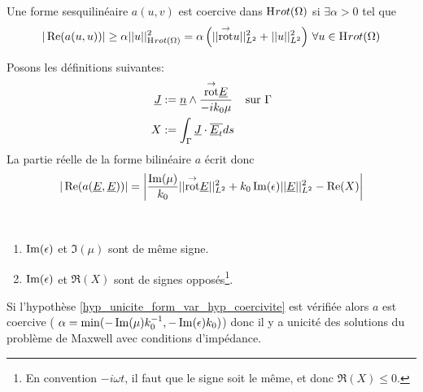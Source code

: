  \begin{defn}[Coercivité]
 Une forme sesquilinéaire $a(u,v)$ est coercive dans $\mathrm{H}_\mathrm{{}}{rot}(\Omega)$ si $\exists \alpha > 0$ tel que 
 \[
 |\operatorname{Re}(a(u,u))| \ge \alpha ||u||_{\mathrm{H}_\mathrm{{}}{rot}(\Omega)}^2 = \alpha \left( || {{\overset{\rightarrow}{\operatorname{rot}}}} u ||_{L^2}^2 + || u ||_{L^2}^2\right) \, \forall u \in \mathrm{H}_\mathrm{{}}{rot}(\Omega)
 \]
 \end{defn}


Posons les définitions suivantes:
\begin{align*}
\underline{J} &:=  \underline{n} \wedge \dfrac{{{\overset{\rightarrow}{\operatorname{rot}}}} \underline{E}}{-ik_0\mu} && \text{sur $\Gamma$}
\\X&:= \int_\Gamma \underline{J} \cdot {\overline{\underline{E}_t}} ds
\end{align*}
La partie réelle de la forme bilinéaire $a$ écrit donc
\begin{equation}
\label{eq_unicite_form_var_decomp_form_bilin_1}
|\operatorname{Re}(a(\underline{E},\underline{E}))| = \left|\dfrac{\operatorname{Im}(\mu)}{k_0} || {{\overset{\rightarrow}{\operatorname{rot}}}} \underline{E} ||_{L^2}^2  + k_0 \operatorname{Im}(\epsilon) || \underline{E} ||_{L^2}^2
- \operatorname{Re}(X)\right|
\end{equation}

\begin{hyp}\label{hyp_unicite_form_var_hyp_coercivite}
~{}

\begin{enumerate}
  \item $\operatorname{Im}(\epsilon)$ et $\Im(\mu)$ sont de même signe.
  \item $\operatorname{Im}(\epsilon)$ et $\Re(X)$ sont de signes opposés\footnote{En convention $-i\omega t$, il faut que le signe soit le même, et donc $\Re(X) \le 0$.}.
\end{enumerate}
\end{hyp}
Si l'hypothèse \ref{hyp_unicite_form_var_hyp_coercivite} est vérifiée alors $a$ est coercive ( $\alpha = \min(-\operatorname{Im}(\mu)k_0^{-1},-\operatorname{Im}(\epsilon)k_0)$) donc il y a unicité des solutions du problème de Maxwell avec conditions d'impédance.

